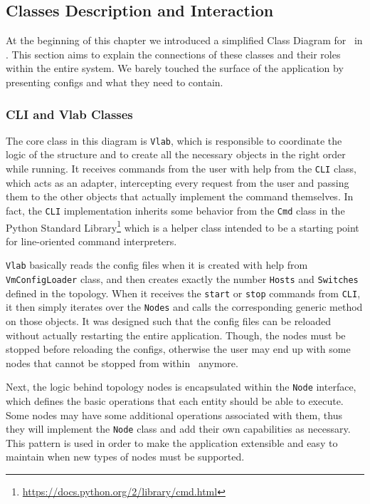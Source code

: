 \subsection{Classes Description and Interaction}
\label{sub-sec:classes-description-interaction}

At the beginning of this chapter we introduced a simplified Class Diagram for \project\ in .
This section aims to explain the connections of these classes and their roles within the entire system.
We barely touched the surface of the application by presenting configs and what they need to contain.

\subsubsection{CLI and Vlab Classes}
\label{sub-sub-sec:cli-vlab-classes}

The core class in this diagram is \texttt{Vlab}, which is responsible to coordinate the logic of the structure and to create all the necessary objects in the right order while running.
It receives commands from the user with help from the \texttt{CLI} class, which acts as an adapter, intercepting every request from the user and passing them to the other objects that actually implement the command themselves.
In fact, the \texttt{CLI} implementation inherits some behavior from the \texttt{Cmd} class in the Python Standard Library\footnote{\url{https://docs.python.org/2/library/cmd.html}} which is a helper class intended to be a starting point for line-oriented command interpreters.

\texttt{Vlab} basically reads the config files when it is created with help from \texttt{VmConfigLoader} class, and then creates exactly the number \texttt{Hosts} and \texttt{Switches} defined in the topology.
When it receives the \texttt{start} or \texttt{stop} commands from \texttt{CLI}, it then simply iterates over the \texttt{Nodes} and calls the corresponding generic method on those objects.
It was designed such that the config files can be reloaded without actually restarting the entire application.
Though, the nodes must be stopped before reloading the configs, otherwise the user may end up with some nodes that cannot be stopped from within \project\ anymore.

Next, the logic behind topology nodes is encapsulated within the \texttt{Node} interface, which defines the basic operations that each entity should be able to execute.
Some nodes may have some additional operations associated with them, thus they will implement the \texttt{Node} class and add their own capabilities as necessary.
This pattern is used in order to make the application extensible and easy to maintain when new types of nodes must be supported.

